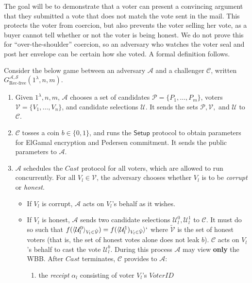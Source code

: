 \documentclass[12pt,a4paper]{article}
\theoremstyle{definition}
\newcommand{\VoterID}{\mathit{VoterID}}
\newcounter{protocol}
\begin{document}
The goal will be to demonstrate that a voter can present a convincing argument that they submitted a vote that does not match the vote sent in the mail. This protects the voter from coercion, but also prevents the voter selling her vote, as a buyer cannot tell whether or not the voter is being honest. We do not prove this for ``over-the-shoulder'' coercion, so an adversary who watches the voter seal and post her envelope can be certain how she voted. A formal definition follows.
\begin{definition}
    Consider the below game between an adversary $\mathcal{A}$ and a challenger $\mathcal{C}$, written $G_{\text{Rec-free}}^{\mathcal{A},\mathcal{S}}(1^\lambda, n, m)$.
    \begin{enumerate}
        \item Given $1^\lambda, n, m$, $\mathcal{A}$ chooses a set of candidates $\mathcal{P}=\{P_1,\ldots,P_m\}$, voters $\mathcal{V}=\{V_1,\ldots,V_n\}$, and candidate selections $\mathcal{U}$. It sends the sets $\mathcal{P}, \mathcal{V},$ and $\mathcal{U}$ to $\mathcal{C}$.
        \item $\mathcal{C}$ tosses a coin $b\in\{0, 1\}$, and runs the $\mathsf{Setup}$ protocol to obtain parameters for ElGamal encryption and Pedersen commitment. It sends the public parameters to $\mathcal{A}$.
        \item $\mathcal{A}$ schedules the $\mathit{Cast}$ protocol for all voters, which are allowed to run concurrently. For all $V_l\in\mathcal{V}$, the adversary chooses whether $V_l$ is to be \textit{corrupt} or \textit{honest}.
        \begin{itemize}
            \item If $V_l$ is corrupt, $\mathcal{A}$ acts on $V_l$'s behalf as it wishes.
            \item If $V_l$ is honest, $\mathcal{A}$ sends two candidate selections $\mathcal{U}_l^0, \mathcal{U}_l^1$ to $\mathcal{C}$. It must do so such that $f(\langle\mathcal{U}_l^0\rangle_{V_l\in \tilde{\mathcal{V}}})=f(\langle\mathcal{U}^1_l)_{V_l\in \tilde{\mathcal{V}}}\rangle`$ where $\tilde{\mathcal{V}}$ is the set of honest voters (that is, the set of honest votes alone does not leak $b$). $\mathcal{C}$ acts on $V_l$'s behalf to cast the vote $\mathcal{U}_l^b$. During this process $\mathcal{A}$ may view \textbf{only} the WBB. After $\mathit{Cast}$ terminates, $\mathcal{C}$ provides to $\mathcal{A}$:
            \begin{enumerate}
                \item the \textit{receipt} $\alpha_l$ consisting of voter $V_l$'s $\VoterID$

\end{enumerate}
\end{itemize}
\end{enumerate}
\end{definition}
\end{document}
